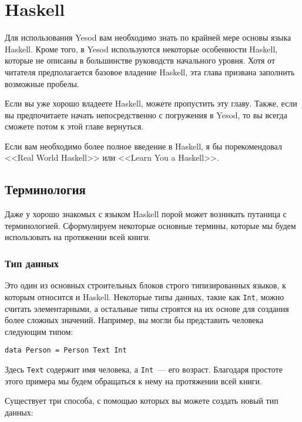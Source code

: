 \chapter{Haskell}

Для использования Yesod вам необходимо знать по крайней мере основы языка Haskell. Кроме того, в Yesod используются некоторые особенности Haskell, которые не описаны в большинстве руководств начального уровня. Хотя от читателя предполагается базовое владение Haskell, эта глава призвана заполнить возможные пробелы.

Если вы уже хорошо владеете Haskell, можете пропустить эту главу. Также, если вы предпочитаете начать непосредственно с погружения в Yesod, то вы всегда сможете потом к этой главе вернуться.

Если вам необходимо более полное введение в Haskell, я бы порекомендовал <<Real World Haskell>> или <<Learn You a Haskell>>.

\section{Терминология}

Даже у хорошо знакомых с языком Haskell порой может возникать путаница с терминологией. Сформулируем некоторые основные термины, которые мы будем использовать на протяжении всей книги.

\subsection{Тип данных}

Это один из основных строительных блоков строго типизированных языков, к которым относится и Haskell. Некоторые типы данных, такие как \lstinline'Int', можно считать элементарными, а остальные типы строятся на их основе для создания более сложных значений. Например, вы могли бы представить человека следующим типом:

\begin{lstlisting}
data Person = Person Text Int
\end{lstlisting}

Здесь \lstinline'Text' содержит имя человека, а \lstinline'Int'~--- его возраст. Благодаря простоте этого примера мы будем обращаться к нему на протяжении всей книги.

Существует три способа, с помощью которых вы можете создать новый тип данных:

